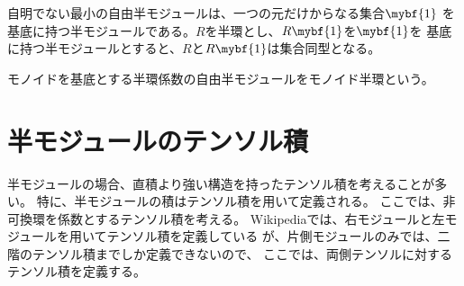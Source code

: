 	自明でない最小の自由半モジュールは、一つの元だけからなる集合$\mybf{1}$
	を基底に持つ半モジュールである。$R$を半環とし、$R\mybf{1}$を$\mybf{1}$を
	基底に持つ半モジュールとすると、$R$と$R\mybf{1}$は集合同型となる。

	\begin{definition}[モノイド半環]\label{def:モノイド半環} %
		モノイドを基底とする半環係数の自由半モジュールをモノイド半環という。
	\end{definition} %

\section{半モジュールのテンソル積}\label{s1:半モジュールのテンソル積} %
	半モジュールの場合、直積より強い構造を持ったテンソル積を考えることが多い。
	特に、半モジュールの積はテンソル積を用いて定義される。
	ここでは、非可換環を係数とするテンソル積を考える。
	Wikipediaでは、右モジュールと左モジュールを用いてテンソル積を定義している
	が、片側モジュールのみでは、二階のテンソル積までしか定義できないので、
	ここでは、両側テンソルに対するテンソル積を定義する。

